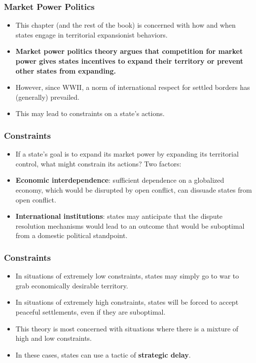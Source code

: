 \documentclass[handout]{beamer}
\begin{document}
\begin{frame} 
	\frametitle{\LARGE{Market Power Politics}}
	\begin{itemize}
		\item This chapter (and the rest of the book) is concerned with how and when states engage in territorial expansionist behaviors. \pause
		\item \textbf{Market power politics theory argues that competition for market power gives states incentives to expand their territory or prevent other states from expanding.}
		\item However, since WWII, a norm of international respect for settled borders has (generally) prevailed. \pause
		\item This may lead to constraints on a state's actions. 
	\end{itemize}
\end{frame}

\begin{frame} 
	\frametitle{\LARGE{Constraints}}
	\begin{itemize}
		\item If a state's goal is to expand its market power by expanding its territorial control, what might constrain its actions? Two factors: \pause
		\item \textbf{Economic interdependence}: sufficient dependence on a globalized economy, which would be disrupted by open conflict, can dissuade states from open conflict. \pause
		\item \textbf{International institutions}: states may anticipate that the dispute resolution mechanisms would lead to an outcome that would be suboptimal from a domestic political standpoint.
	\end{itemize}
\end{frame}	

\begin{frame} 
	\frametitle{\LARGE{Constraints}}
	\begin{itemize}
		\item In situations of extremely low constraints, states may simply go to war to grab economically desirable territory. \pause
		\item In situations of extremely high constraints, states will be forced to accept peaceful settlements, even if they are suboptimal. \pause
		\item This theory is most concerned with situations where there is a mixture of high and low constraints. \pause 
		\item In these cases, states can use a tactic of \textbf{strategic delay}.
	\end{itemize}
\end{frame}	
\end{document}
